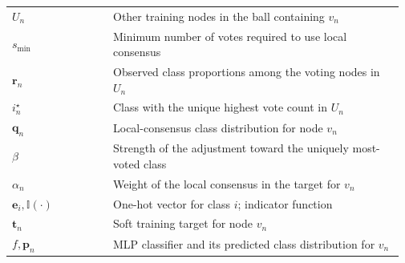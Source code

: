 \begin{table}[!htbp]
\begin{tabular}{@{}p{0.25\linewidth}p{0.72\linewidth}@{}}
\(U_n\) & Other training nodes in the ball containing \(v_n\) \\
\(s_{\min}\) & Minimum number of votes required to use local consensus \\
\(\mathbf r_n\) & Observed class proportions among the voting nodes in \(U_n\) \\
\(i_n^\star\) & Class with the unique highest vote count in \(U_n\) \\
\(\mathbf q_n\) & Local-consensus class distribution for node \(v_n\) \\
\(\beta\) & Strength of the adjustment toward the uniquely most-voted class \\
\(\alpha_n\) & Weight of the local consensus in the target for \(v_n\) \\
\(\mathbf e_i,\mathbb I(\cdot)\) & One-hot vector for class \(i\); indicator function \\
\(\mathbf t_n\) & Soft training target for node \(v_n\) \\
\(f,\mathbf p_n\) & MLP classifier and its predicted class distribution for \(v_n\) \\
\bottomrule
\end{tabular}
\endgroup
\end{table}
